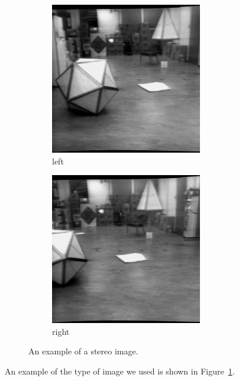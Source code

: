 \begin{figure}
    \centering
    \begin{subfigure}{0.5\textwidth}
        \centering
        \includegraphics[width=0.6\linewidth]{img/cart_orig_left.png}
        \caption{left}
    \end{subfigure}%
    \begin{subfigure}{0.5\textwidth}
        \centering
        \includegraphics[width=0.6\linewidth]{img/cart_orig_right.png}
        \caption{right}
    \end{subfigure}
    \caption{An example of a stereo image.}
    \label{fig:cart_orig}
\end{figure}

An example of the type of image we used is shown in Figure~\ref{fig:cart_orig}.

